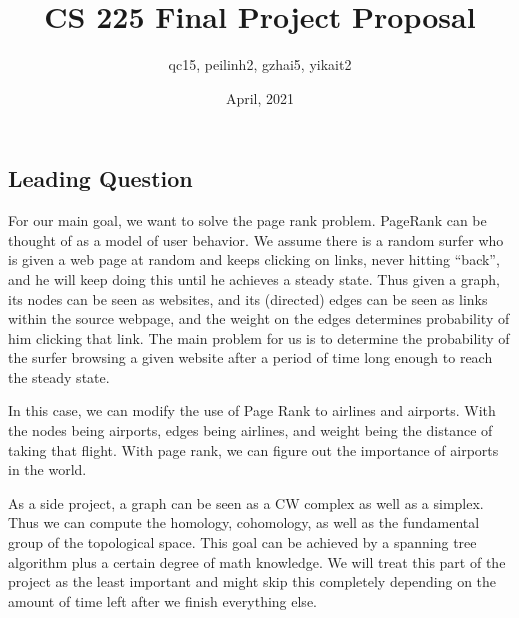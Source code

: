 \documentclass[11pt]{amsart}
\title{CS 225 Final Project Proposal}
\author{qc15, peilinh2, gzhai5, yikait2}
\date{April, 2021}
\theoremstyle{definition}
\begin{document}
\begin{spacing}{1}

\maketitle


\section{Leading Question}
    For our main goal, we want to solve the page rank problem. PageRank can be thought of as a model of user behavior. We assume there is a random surfer who is given a web page at random and keeps clicking on links, never hitting “back”, and he will keep doing this until he achieves a steady state. Thus given a graph, its nodes can be seen as websites, and its (directed) edges can be seen as links within the source webpage, and the weight on the edges determines probability of him clicking that link. The main problem for us is to determine the probability of the surfer browsing a given website after a period of time long enough to reach the steady state.
    
    In this case, we can modify the use of Page Rank to airlines and airports. With the nodes being airports, edges being airlines, and weight being the distance of taking that flight. With page rank, we can figure out the importance of airports in the world.
    
    As a side project, a graph can be seen as a CW complex as well as a simplex. Thus we can compute the homology, cohomology, as well as the fundamental group of the topological space. This goal can be achieved by a spanning tree algorithm plus a certain degree of math knowledge. We will treat this part of the project as the least important and might skip this completely depending on the amount of time left after we finish everything else.

\vspace{0.6cm}

\end{spacing}
\end{document}
